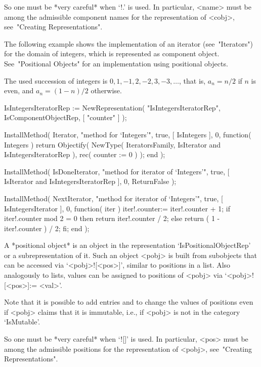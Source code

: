 So one must be *very careful* when `!.' is used.
In particular, <name> must be among the admissible component names for
the representation of <cobj>, see~"Creating Representations".

The following example shows the implementation of an iterator
(see~"Iterators") for the domain of integers,
which is represented as component object.
See~"Positional Objects" for an implementation using positional objects.

The used succession of integers is $0, 1, -1, 2, -2, 3, -3, \ldots$,
that is, $a_n = n/2$ if $n$ is even,
and $a_n = (1-n)/2$ otherwise.

\begintt
    IsIntegersIteratorRep := NewRepresentation( "IsIntegersIteratorRep",
        IsComponentObjectRep, [ "counter" ] );

    InstallMethod( Iterator,
        "method for `Integers'",
        true,
        [ IsIntegers ], 0,
        function( Integers )
        return Objectify( NewType( IteratorsFamily,
                                       IsIterator
                                   and IsIntegersIteratorRep ),
                          rec( counter := 0 ) );
        end );

    InstallMethod( IsDoneIterator,
        "method for iterator of `Integers'",
        true,
        [ IsIterator and IsIntegersIteratorRep ], 0,
        ReturnFalse );

    InstallMethod( NextIterator,
        "method for iterator of `Integers'",
        true,
        [ IsIntegersIterator ], 0,
        function( iter )
        iter!.counter:= iter!.counter + 1;
        if iter!.counter mod 2 = 0 then
          return iter!.counter / 2;
        else
          return ( 1 - iter!.counter ) / 2;
        fi;
        end );
\endtt


A *positional object* is an object in the representation
`IsPositionalObjectRep' or a subrepresentation of it.
Such an object <pobj> is built from subobjects that can be accessed via
`<pobj>![<pos>]', similar to positions in a list.
Also analogously to lists, values can be assigned to positions of
<pobj> via `<pobj>![<pos>]:= <val>'.

Note that it is possible to add entries and to change the values of
positions even if <pobj> claims that it is immutable, i.e., if <pobj>
is not in the category `IsMutable'.

So one must be *very careful* when `![]' is used.
In particular, <pos> must be among the admissible positions for
the representation of <pobj>, see~"Creating Representations".


